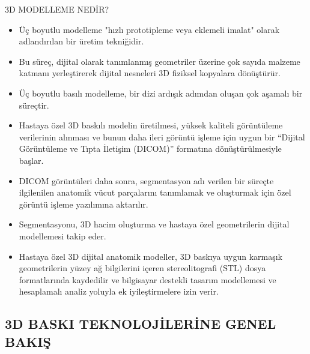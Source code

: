 \documentclass{beamer}
\begin{document}
\begin{frame}[allowframebreaks]{3D MODELLEME NEDİR?}

\begin{itemize}
    \item Üç boyutlu modelleme "hızlı prototipleme veya eklemeli imalat" olarak adlandırılan bir üretim tekniğidir. 
    \item Bu süreç, dijital olarak tanımlanmış geometriler üzerine çok sayıda malzeme katmanı yerleştirerek dijital nesneleri 3D fiziksel kopyalara dönüştürür. 
    \item Üç boyutlu basılı modelleme, bir dizi ardışık adımdan oluşan çok aşamalı bir süreçtir. 
    \item Hastaya özel 3D baskılı modelin üretilmesi, yüksek kaliteli görüntüleme verilerinin alınması ve bunun daha ileri görüntü işleme için uygun bir “Dijital Görüntüleme ve Tıpta İletişim (DICOM)” formatına dönüştürülmesiyle başlar. 
    \item DICOM görüntüleri daha sonra, segmentasyon adı verilen bir süreçte ilgilenilen anatomik vücut parçalarını tanımlamak ve oluşturmak için özel görüntü işleme yazılımına aktarılır. 
    \item Segmentasyonu, 3D hacim oluşturma ve hastaya özel geometrilerin dijital modellemesi takip eder. 
    \item Hastaya özel 3D dijital anatomik modeller, 3D baskıya uygun karmaşık geometrilerin yüzey ağ bilgilerini içeren stereolitografi (STL) dosya formatlarında kaydedilir ve bilgisayar destekli tasarım modellemesi ve hesaplamalı analiz yoluyla ek iyileştirmelere izin verir.
\end{itemize}

\end{frame}

\subsection{3D BASKI TEKNOLOJİLERİNE GENEL BAKIŞ}
\end{document}

